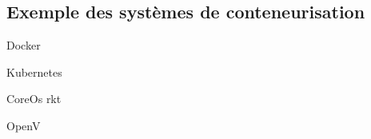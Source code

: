 \subsection{Exemple des systèmes de conteneurisation}
\begin{list}{•}
	\item Docker
	\item Kubernetes
	\item CoreOs rkt
	\item OpenV
\end{list}
